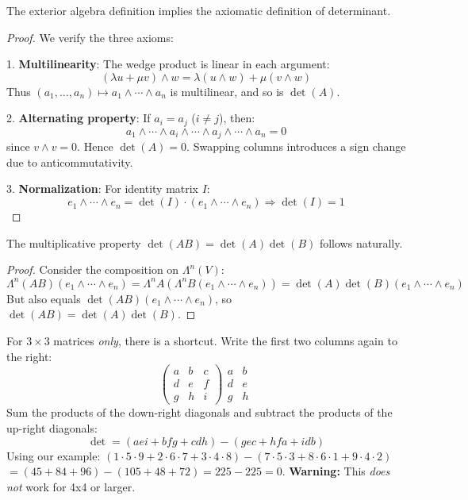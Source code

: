 \begin{theorem}
The exterior algebra definition implies the axiomatic definition of determinant.
\end{theorem}

\begin{proof}
We verify the three axioms:

1. \textbf{Multilinearity}: The wedge product is linear in each argument:
\[
(\lambda u + \mu v) \wedge w = \lambda(u \wedge w) + \mu(v \wedge w)
\]
Thus $(a_1, \ldots, a_n) \mapsto a_1 \wedge \cdots \wedge a_n$ is multilinear, and so is $\det(A)$.

2. \textbf{Alternating property}: If $a_i = a_j$ ($i \neq j$), then:
\[
a_1 \wedge \cdots \wedge a_i \wedge \cdots \wedge a_j \wedge \cdots \wedge a_n = 0
\]
since $v \wedge v = 0$. Hence $\det(A) = 0$. Swapping columns introduces a sign change due to anticommutativity.

3. \textbf{Normalization}: For identity matrix $I$:
\[
e_1 \wedge \cdots \wedge e_n = \det(I) \cdot (e_1 \wedge \cdots \wedge e_n) \Rightarrow \det(I) = 1
\]
\end{proof}

\begin{corollary}
The multiplicative property $\det(AB) = \det(A)\det(B)$ follows naturally.
\end{corollary}

\begin{proof}
Consider the composition on $\Lambda^n(V)$:
\[
\Lambda^n(AB)(e_1 \wedge \cdots \wedge e_n) = \Lambda^nA(\Lambda^nB(e_1 \wedge \cdots \wedge e_n)) = \det(A)\det(B)(e_1 \wedge \cdots \wedge e_n)
\]
But also equals $\det(AB)(e_1 \wedge \cdots \wedge e_n)$, so $\det(AB) = \det(A)\det(B)$.
\end{proof}

\begin{remark}
For $3 \times 3$ matrices \emph{only}, there is a shortcut.
% 
Write the first two columns again to the right:
\[
\begin{pmatrix} a & b & c \\ d & e & f \\ g & h & i \end{pmatrix}
\begin{matrix} a & b \\ d & e \\ g & h \end{matrix}
\]
Sum the products of the down-right diagonals and subtract the products of the up-right diagonals:
\[ \det = (aei + bfg + cdh) - (gec + hfa + idb) \]
Using our example:
$(1\cdot 5\cdot 9 + 2\cdot 6\cdot 7 + 3\cdot 4\cdot 8) - (7\cdot 5\cdot 3 + 8\cdot 6\cdot 1 + 9\cdot 4\cdot 2)$
$= (45 + 84 + 96) - (105 + 48 + 72) = 225 - 225 = 0$.
\textbf{Warning:} This \emph{does not} work for 4x4 or larger.
\end{remark}

